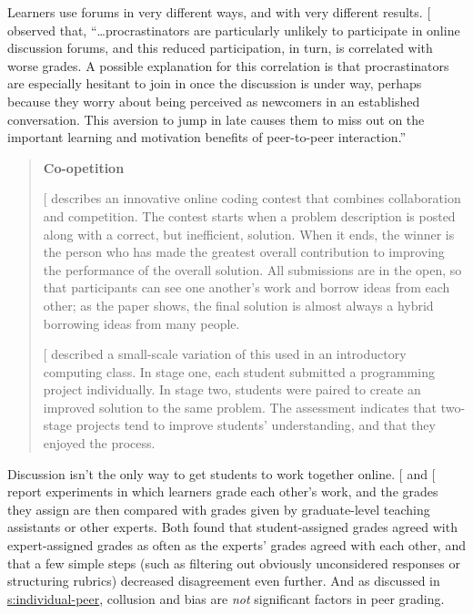 Learners use forums in very different ways, and with very different
results. {[}\protect[\hyperlink{b:Mill2016a}{Mill2016a}]{]} observed that, ``\ldots{}procrastinators are
particularly unlikely to participate in online discussion forums, and
this reduced participation, in turn, is correlated with worse
grades. A possible explanation for this correlation is that
procrastinators are especially hesitant to join in once the discussion
is under way, perhaps because they worry about being perceived as
newcomers in an established conversation. This aversion to jump in
late causes them to miss out on the important learning and motivation
benefits of peer-to-peer interaction.''

\begin{quote}\setlength{\parindent}{0pt}
\textbf{Co-opetition}

{[}\protect[\hyperlink{b:Gull2004}{Gull2004}]{]} describes an innovative online coding contest that
combines collaboration and competition. The contest starts when a
problem description is posted along with a correct, but inefficient,
solution. When it ends, the winner is the person who has made the
greatest overall contribution to improving the performance of the
overall solution. All submissions are in the open, so that
participants can see one another's work and borrow ideas from each
other; as the paper shows, the final solution is almost always a
hybrid borrowing ideas from many people.

{[}\protect[\hyperlink{b:Batt2018}{Batt2018}]{]} described a small-scale variation of this used in
an introductory computing class. In stage one, each student submitted
a programming project individually. In stage two, students were paired
to create an improved solution to the same problem. The assessment
indicates that two-stage projects tend to improve students'
understanding, and that they enjoyed the process.
\end{quote}

Discussion isn't the only way to get students to work together online.
{[}\protect[\hyperlink{b:Pare2008}{Pare2008}]{]} and {[}\protect[\hyperlink{b:Kulk2013}{Kulk2013}]{]} report experiments in which
learners grade each other's work, and the grades they assign are then
compared with grades given by graduate-level teaching assistants or
other experts. Both found that student-assigned grades agreed with
expert-assigned grades as often as the experts' grades agreed with each
other, and that a few simple steps (such as filtering out obviously
unconsidered responses or structuring rubrics) decreased disagreement
even further. And as discussed in \protect\hyperlink{SECTION}{s:individual-peer},
collusion and bias are \emph{not} significant factors in peer grading.

